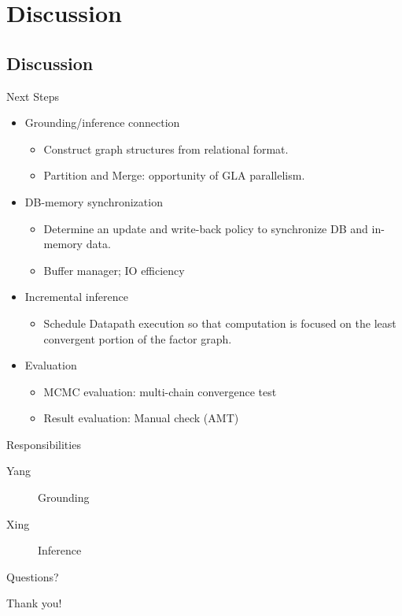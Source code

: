 \documentclass[onlymath,xcolor=pdftex,dvipsnames,table]{beamer}
\begin{document}
\section{Discussion}
\subsection{Discussion}
\begin{frame}{Next Steps}
\begin{itemize}
  \item Grounding/inference connection
    \begin{itemize}
      \item Construct graph structures from relational format.
      \item Partition and Merge: opportunity of GLA parallelism.
    \end{itemize}
  \item DB-memory synchronization
    \begin{itemize}
      \item Determine an update and write-back policy to synchronize DB and in-memory data.
      \item Buffer manager; IO efficiency
    \end{itemize}
  \item Incremental inference
    \begin{itemize}
      \item Schedule Datapath execution so that computation is focused on the least convergent portion of the factor graph.
    \end{itemize}
  \item Evaluation
    \begin{itemize}
      \item MCMC evaluation: multi-chain convergence test
      \item Result evaluation: Manual check (AMT)
    \end{itemize}
\end{itemize}
\end{frame}


\begin{frame}{Responsibilities}
\begin{description}
  \item[Yang] Grounding
  \item[Xing] Inference
\end{description}
\end{frame}


\begin{frame}{Questions?}
\begin{center}
  \LARGE Thank you!
\end{center}
\end{frame}
\end{document}
